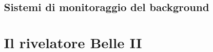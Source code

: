 \subsection{Sistemi di monitoraggio del background}

\begin{comment}
Il background è una delle principali problematiche di un rivelatore, sia per le misure di precisione di fisica, sia per le performance dei vari strati rivelatori di cui è formato Belle II.
A tal ragione, vengono utilizzati diversi rivelatori per poter avere misure della dose di radiazione sia sul rivelatore che su zone delicate dell'acceleratore, per poter intervenire quanto prima in caso di livelli troppo elevati. Grandi dosi di radiazione infatti, posso causare danni accidentali sul rivelatore, diminuendone le performance.??????????????????????
Tra i principali (?) ci sono:

\begin{itemize}
\item Detector di diamante (chiamati ''Diamanti'') che monitorano il rate della dose di radiazione nella zona d'interazione della beam pipe. Questi rientrano anche nel ''fast beam abort system'', cioè un sistema di controllo che considera dati di diversi detector per poter valutare lo ''spegnimento'' dei fasci, per evitare che situazioni fuori controllo arrechino danni a tutta la struttura.
\item il CLAWS (sCintillation Light And Waveform Sensors), formato da scintillatori di materiale plastico e fotomoltiplicatori di silicio, usato per monitorare il background di Belle II in corrispondenza dell'iniezione del fascio (nell'anello principale). Con i diamanti fa parte della logica del sistema di aborto del fascio.
\item TPC's (Time Projection Chambers) che fornisce misure sulla direzione del flusso dei neutroni nel tunnel che ospita l'acceleratore.
\item Tubi di $He^{3}$ per il conteggio dei neutroni termici (con energie cinetiche inferiori a 1/10 di eV, generalmente intorno a 0.025 eV) intorno al rivelatore Belle II.
\end{itemize}

\end{comment}
\section{Il rivelatore Belle II}

